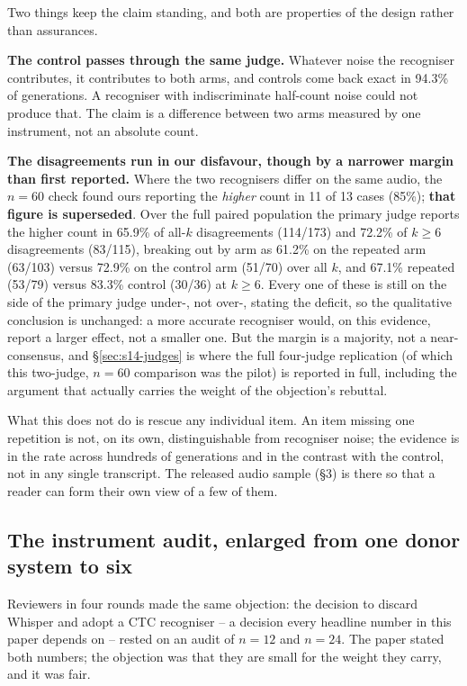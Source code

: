 \documentclass[11pt]{article}
\begin{document}
Two things keep the claim standing, and both are properties of the design rather
than assurances.

\noindent\textbf{The control passes through the same judge.} Whatever noise the
recogniser contributes, it contributes to both arms, and controls come back
exact in 94.3\% of generations. A recogniser with indiscriminate
half-count noise could not produce that. The claim is a difference between two
arms measured by one instrument, not an absolute count.

\noindent\textbf{The disagreements run in our disfavour, though by a narrower
margin than first reported.} Where the two recognisers differ on the same
audio, the $n{=}60$ check found ours reporting the \emph{higher} count in 11 of
13 cases (85\%); \textbf{that figure is superseded}. Over the full paired
population the primary judge reports the higher count in 65.9\% of all-$k$
disagreements (114/173) and 72.2\% of $k\ge6$ disagreements (83/115), breaking
out by arm as 61.2\% on the repeated arm (63/103) versus 72.9\% on the control
arm (51/70) over all $k$, and 67.1\% repeated (53/79) versus 83.3\% control
(30/36) at $k\ge6$. Every one of these is still on the side of the primary
judge under-, not over-, stating the deficit, so the qualitative conclusion is
unchanged: a more accurate recogniser would, on this evidence, report a larger
effect, not a smaller one. But the margin is a majority, not a near-consensus,
and \S\ref{sec:s14-judges} is where the full four-judge replication (of
which this two-judge, $n{=}60$ comparison was the pilot) is reported in
full, including the argument that actually carries the weight of the
objection's rebuttal.

What this does not do is rescue any individual item. An item missing one
repetition is not, on its own, distinguishable from recogniser noise; the
evidence is in the rate across hundreds of generations and in the contrast with
the control, not in any single transcript. The released audio sample (\S3) is
there so that a reader can form their own view of a few of them.

\subsection{The instrument audit, enlarged from one donor system to six}
\label{sec:s14-enlarged}

Reviewers in four rounds made the same objection: the decision to discard Whisper
and adopt a CTC recogniser -- a decision every headline number in this paper
depends on -- rested on an audit of $n{=}12$ and $n{=}24$. The paper stated both
numbers; the objection was that they are small for the weight they carry, and it
was fair.
\end{document}
